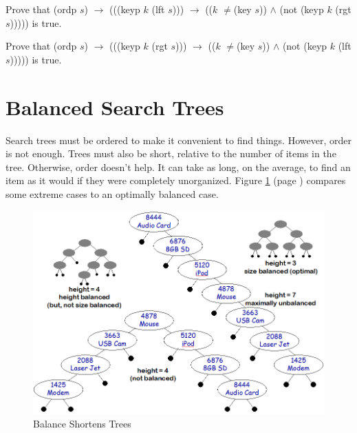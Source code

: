 \begin{ExerciseList}
\Exercise Prove that
(ordp $s$) $\rightarrow$ (((keyp $k$ (lft $s$))) $\rightarrow$ (($k$ $\ne$(key $s$)) $\wedge$ (not (keyp $k$ (rgt $s$)))))
is true.

\Exercise Prove that
(ordp $s$) $\rightarrow$ (((keyp $k$ (rgt $s$))) $\rightarrow$ (($k$ $\ne$(key $s$)) $\wedge$ (not (keyp $k$ (lft $s$)))))
is true.
\end{ExerciseList}

\section{Balanced Search Trees}

Search trees must be ordered to make it convenient to find things.
However, order is not enough.
Trees must also be short, relative to the number of items in the tree.
Otherwise, order doesn't help.
It can take as long, on the average, to find an item as it would
if they were completely unorganized.
Figure \ref{fig:unbalanced-trees} (page \pageref{fig:unbalanced-trees})
compares some extreme cases to an optimally balanced case.

\begin{figure}
\begin{center}
\includegraphics[scale=0.5]{images/unbalanced-trees.png}
\end{center}
\caption{Balance Shortens Trees}
\label{fig:unbalanced-trees}
\end{figure}

